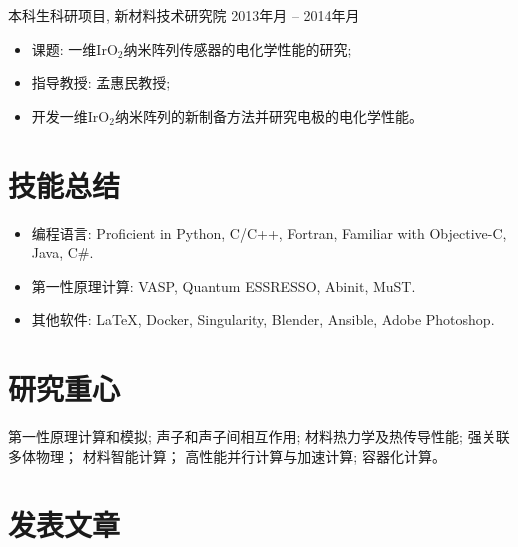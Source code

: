 \documentclass[
  a4paper,
  12pt
]{cv}
\renewcommand{\DatestampYMD}[3]{\mbox{#1年\number#2月}}
\begin{document}

\vspace{.25em}
本科生科研项目,
新材料技术研究院
\hfill
\DatestampYMD{2013}{10}{05} --
\DatestampYMD{2014}{05}{31}
\begin{itemize}
\item 课题: 一维IrO$_{2}$纳米阵列传感器的电化学性能的研究; 
\item 指导教授: 孟惠民教授; 
\item 开发一维IrO$_{2}$纳米阵列的新制备方法并研究电极的电化学性能。
\end{itemize}


\section{技能总结}
\begin{itemize}
\item
编程语言:   
Proficient in
Python, C/C++, Fortran, 
Familiar with Objective-C, Java, C\#.
\item
第一性原理计算: 
VASP, Quantum ESSRESSO, Abinit, MuST.
\item
其他软件:    
{\LaTeX}, 
Docker,
Singularity,
Blender,
Ansible,
Adobe Photoshop.
\end{itemize}


\section{研究重心}
第一性原理计算和模拟;
声子和声子间相互作用;
材料热力学及热传导性能; 
强关联多体物理；
材料智能计算；
高性能并行计算与加速计算;
容器化计算。



\section{发表文章}
\end{document}
